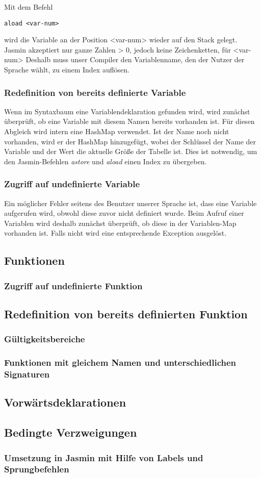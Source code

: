 Mit dem Befehl
\begin{lstlisting}[frame=single]
aload <var-num>
\end{lstlisting}
wird die Variable an der Position <var-num> wieder auf den Stack gelegt. 
Jasmin akzeptiert nur ganze Zahlen > 0, jedoch keine Zeichenketten, für <var-num>
Deshalb muss unser Compiler den Variablenname, den der Nutzer der Sprache wählt, zu einem Index auflösen.

\subsubsection{Redefinition von bereits definierte Variable}
Wenn im Syntaxbaum eine Variablendeklaration gefunden wird, wird zunächst überprüft, ob eine Variable mit diesem Namen bereits vorhanden ist. Für diesen Abgleich wird intern eine HashMap verwendet. Ist der Name noch nicht vorhanden, wird er der HashMap hinzugefügt, wobei der Schlüssel der Name der Variable und der Wert die aktuelle Größe der Tabelle ist. Dies ist notwendig, um den Jasmin-Befehlen \textit{astore} und \textit{aload} einen Index  zu übergeben.

\subsubsection{Zugriff auf undefinierte Variable}
Ein möglicher Fehler seitens des Benutzer unserer Sprache ist, dass eine Variable aufgerufen wird, obwohl diese zuvor nicht definiert wurde. Beim Aufruf einer Variablen wird deshalb zunächst überprüft, ob diese in der Variablen-Map vorhanden ist. Falls nicht wird eine entsprechende Exception ausgelöst.


\subsection{Funktionen}
\subsubsection{Zugriff auf undefinierte Funktion}
\subsection{Redefinition von bereits definierten Funktion}
\subsubsection{Gültigkeitsbereiche}
\subsubsection{Funktionen mit gleichem Namen und unterschiedlichen Signaturen}
\subsection{Vorwärtsdeklarationen}

\subsection{Bedingte Verzweigungen}
\subsubsection{Umsetzung in Jasmin mit Hilfe von Labels und Sprungbefehlen}


